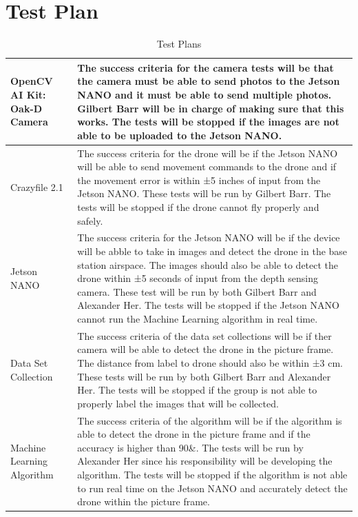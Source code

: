 \documentclass[12pt,onecolumn]{IEEEtran}			%
\begin{document}
\section{Test Plan}
\begin{table}[h!]
\begin{center}
\begin{tabular}{| m{3cm} | m{13cm}| } 
 \hline
  OpenCV AI Kit: Oak-D Camera & The success criteria for the camera tests will be that the camera must be able to send photos to the Jetson NANO and it must be able to send multiple photos. Gilbert Barr will be in charge of making sure that this works. The tests will be stopped if the images are not able to be uploaded to the Jetson NANO.   \\
 \hline
 Crazyfile 2.1 & The success criteria for the drone will be if the Jetson NANO will be able to send movement commands to the drone and if the movement error is within ±5 inches of input from the Jetson NANO. These tests will be run by Gilbert Barr. The tests will be stopped if the drone cannot fly properly and safely.   \\
 \hline
 Jetson NANO & The success criteria for the Jetson NANO will be if the device will be abble to take in images and detect the drone in the base station airspace. The images should also be able to detect the drone within ±5 seconds of input from the depth sensing camera. These test will be run by both Gilbert Barr and Alexander Her. The tests will be stopped if the Jetson NANO cannot run the Machine Learning algorithm in real time.   \\
 \hline
 Data Set Collection & The success criteria of the data set collections will be if ther camera will be able to detect the drone in the picture frame. The distance from label to drone should also be within ±3 cm. These tests will be run by both Gilbert Barr and Alexander Her. The tests will be stopped if the group is not able to properly label the images that will be collected.    \\
 \hline
 Machine Learning Algorithm & The success criteria of the algorithm will be if the algorithm is able to detect the drone in the picture frame and if the accuracy is higher than 90\&. The tests will be run by Alexander Her since his responsibility will be developing the algorithm. The tests will be stopped if the algorithm is not able to run real time on the Jetson NANO and accurately detect the drone within the picture frame.  \\
 \hline
\end{tabular}
\end{center}
\caption{Test Plans}
\label{Test Table:1}
\end{table}
\end{document}
